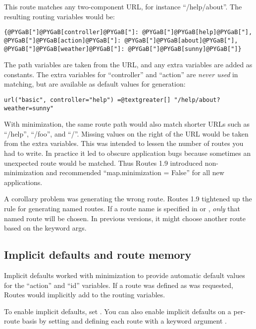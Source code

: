 \documentclass[letterpaper,10pt,english]{manual}
\begin{document}
This route matches any two-component URL, for instance ``/help/about''.  The
resulting routing variables would be:

\begin{Verbatim}[commandchars=@\[\]]
{@PYGaB["]@PYGaB[controller]@PYGaB["]: @PYGaB["]@PYGaB[help]@PYGaB["], @PYGaB["]@PYGaB[action]@PYGaB["]: @PYGaB["]@PYGaB[about]@PYGaB["], @PYGaB["]@PYGaB[weather]@PYGaB["]: @PYGaB["]@PYGaB[sunny]@PYGaB["]}
\end{Verbatim}

The path variables are taken from the URL, and any extra variables are added as
constants.  The extra variables for ``controller'' and ``action'' are \emph{never used}
in matching, but are available as default values for generation:

\begin{Verbatim}[commandchars=@\[\]]
url("basic", controller="help") =@textgreater[] "/help/about?weather=sunny"
\end{Verbatim}

With minimization, the same route path would also match shorter URLs such as
``/help'', ``/foo'', and ``/''.  Missing values on the right of the URL would be
taken from the extra variables.  This was intended to lessen the number of
routes you had to write.  In practice it led to obscure application bugs
because sometimes an unexpected route would be matched.  Thus Routes 1.9
introduced non-minimization and recommended ``map.minimization = False'' for
all new applications.

A corollary problem was generating the wrong route.  Routes 1.9 tightened up
the rule for generating named routes.  If a route name is specified in
 or , \emph{only} that named route will be chosen.  In
previous versions, it might choose another route based on the keyword args.


\subsection{Implicit defaults and route memory}

Implicit defaults worked with minimization to provide automatic default values
for the ``action'' and ``id'' variables.  If a route was defined as
 was
requested, Routes would implicitly add  to the
routing variables.

To enable implicit defaults, set .  You can also enable implicit defaults on a per-route basis by setting
 and defining each route with a keyword argument .
\end{document}
